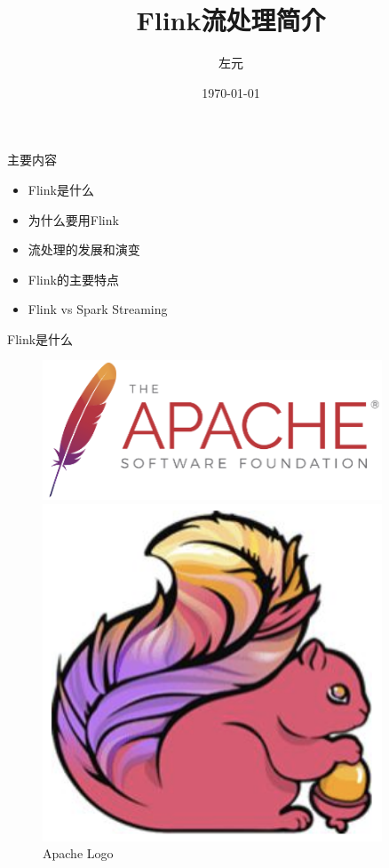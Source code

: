 \documentclass{beamer}
\title{Flink流处理简介}
\date{\today}
\author{左元}
\institute{尚硅谷 大数据组}
\begin{document}
  \maketitle
  \begin{frame}{主要内容}
    \begin{itemize}
      \item Flink是什么
      \item 为什么要用Flink
      \item 流处理的发展和演变
      \item Flink的主要特点
      \item Flink vs Spark Streaming
    \end{itemize}
  \end{frame}

  \begin{frame}{Flink是什么}
    \begin{figure}
        \centering
        \begin{minipage}{0.45\textwidth}
            \centering
            \includegraphics[width=0.9\textwidth, height=0.4\textheight]{image1.png} %
            \caption{Apache Logo}
        \end{minipage}\hfill
        \begin{minipage}{0.45\textwidth}
            \centering
            \includegraphics[width=0.9\textwidth, height=0.4\textheight]{image2.png} %

\end{minipage}
\end{figure}
\end{frame}
\end{document}
